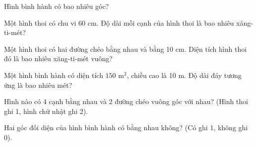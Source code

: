 \begin{ex}
Hình bình hành có bao nhiêu góc?
\end{ex}

\begin{ex}
Một hình thoi có chu vi 60 cm. Độ dài mỗi cạnh của hình thoi là bao nhiêu xăng-ti-mét?
\end{ex}

\begin{ex}
Một hình thoi có hai đường chéo bằng nhau và bằng 10 cm. Diện tích hình thoi đó là bao nhiêu xăng-ti-mét vuông?
\end{ex}

\begin{ex}
Một hình bình hành có diện tích $150\text{ m}^2$, chiều cao là 10 m. Độ dài đáy tương ứng là bao nhiêu mét?
\end{ex}

\begin{ex}
Hình nào có 4 cạnh bằng nhau và 2 đường chéo vuông góc với nhau? (Hình thoi ghi 1, hình chữ nhật ghi 2).
\end{ex}

\begin{ex}
Hai góc đối diện của hình bình hành có bằng nhau không? (Có ghi 1, không ghi 0).
\end{ex}
